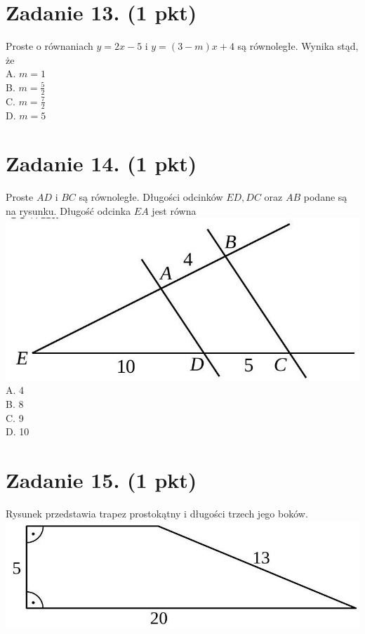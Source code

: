 \documentclass[10pt]{article}
\begin{document}
\section*{Zadanie 13. (1 pkt)}
Proste o równaniach \(y=2 x-5\) i \(y=(3-m) x+4\) są równoległe. Wynika stąd, że\\
A. \(m=1\)\\
B. \(m=\frac{5}{2}\)\\
C. \(m=\frac{7}{2}\)\\
D. \(m=5\)

\section*{Zadanie 14. (1 pkt)}
Proste \(A D\) i \(B C\) są równoległe. Długości odcinków \(E D, D C\) oraz \(A B\) podane są na rysunku. Długość odcinka \(E A\) jest równa\\
\includegraphics[max width=\textwidth, center]{2024_11_21_2c2c97b7feae6d70b078g-04}\\
A. 4\\
B. 8\\
C. 9\\
D. 10

\section*{Zadanie 15. (1 pkt)}
Rysunek przedstawia trapez prostokątny i długości trzech jego boków.\\
\includegraphics[max width=\textwidth, center]{2024_11_21_2c2c97b7feae6d70b078g-04(1)}
\end{document}
